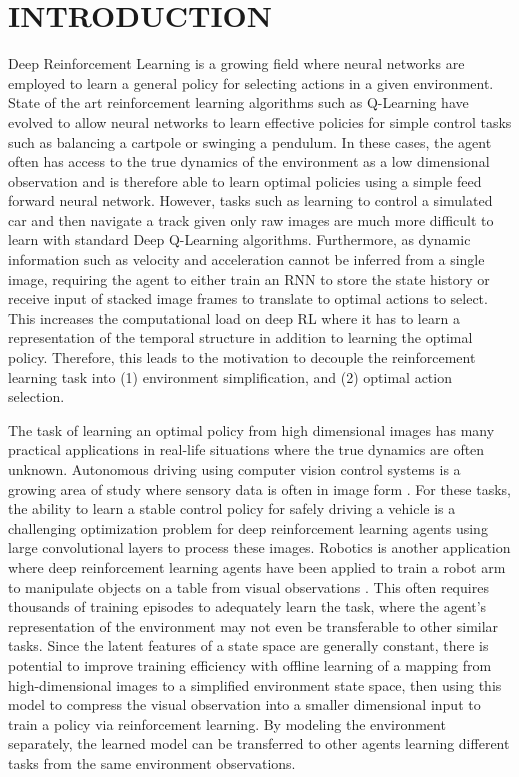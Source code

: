 \section{INTRODUCTION}

Deep Reinforcement Learning is a growing field where neural networks are employed to learn a general policy for selecting actions in a given environment. State of the art reinforcement learning algorithms such as Q-Learning have evolved to allow neural networks to learn effective policies for simple control tasks such as balancing a cartpole or swinging a pendulum. In these cases, the agent often has access to the true dynamics of the environment as a low dimensional observation and is therefore able to learn optimal policies using a simple feed forward neural network. However, tasks such as learning to control a simulated car and then navigate a track given only raw images are much more difficult to learn with standard Deep Q-Learning algorithms. Furthermore, as dynamic information such as velocity and acceleration cannot be inferred from a single image, requiring the agent to either train an RNN to store the state history or receive input of stacked image frames to translate to optimal actions to select. This increases the computational load on deep RL where it has to learn a representation of the temporal structure in addition to learning the optimal policy. Therefore, this leads to the motivation to decouple the reinforcement learning task into (1) environment simplification, and (2) optimal action selection.

The task of learning an optimal policy from high dimensional images has many practical applications in real-life situations where the true dynamics are often unknown. Autonomous driving using computer vision control systems is a growing area of study where sensory data is often in image form \cite{4.0}. For these tasks, the ability to learn a stable control policy for safely driving a vehicle is a challenging optimization problem for deep reinforcement learning agents using large convolutional layers to process these images. Robotics is another application where deep reinforcement learning agents have been applied to train a robot arm to manipulate objects on a table from visual observations \cite{5.0}. This often requires thousands of training episodes to adequately learn the task, where the agent's representation of the environment may not even be transferable to other similar tasks. Since the latent features of a state space are generally constant, there is potential to improve training efficiency with offline learning of a mapping from high-dimensional images to a simplified environment state space, then using this model to compress the visual observation into a smaller dimensional input to train a policy via reinforcement learning. By modeling the environment separately, the learned model can be transferred to other agents learning different tasks from the same environment observations.

